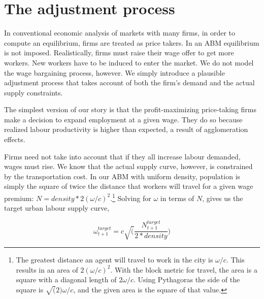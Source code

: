 \section{The adjustment process}
In conventional economic analysis of markets with many firms, in order to compute an equilibrium, firms are treated as price takers. In an ABM equilibrium is not imposed. Realistically, firms must raise their wage offer to get more workers. New workers have to be induced to enter the market. We do not model the wage bargaining process, however. We simply introduce a plausible adjustment process that takes account of both the firm's demand and the actual supply constraints.  


The simplest version of our story is that the profit-maximizing price-taking firms make a decision to expand employment at a given wage. They do so because realized labour productivity is higher than expected,  a result of agglomeration effects.

Firms need not take into account that if they all increase labour demanded, wages must rise. We know that the actual supply curve, however, is constrained by the transportation cost. In our ABM with uniform density, population is simply the square of twice the distance that workers will travel for a given wage premium: $N=density*2(\omega/c)^2$.\footnote{The greatest distance  an agent will travel to work in the city is $\omega/c$. This results in an area of $2(\omega/c)^2$. With the block metric for travel, the area is a square with a diagonal length of $2\omega/c$. Using Pythagoras the side of the square is $\sqrt(2)\omega/c$, and the given area is the square of that value.} %
Solving for $\omega$ in terms of $N$, %
gives us the target urban labour supply curve, 

\begin{equation}
   \omega^{target}_{t+1}= c\sqrt(\frac{N^{target}_{t+1}}{2 * density})
\end{equation}

